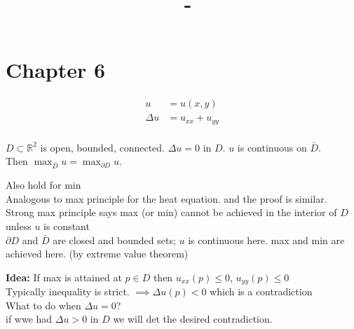 \documentclass[answers, 12pts,addpoints]{exam}
\author{\name}
\title{\course \ - \assignment}
\begin{document}
\maketitle

\section*{Chapter 6}
\begin{align*}
    u &= u(x,y)\\
    \Delta u &= u_{xx} + u_{yy}\\
\end{align*}
\begin{definition}
    $D \subset \mathbb{R}^2$ is open, bounded, connected. $\Delta u = 0$ in $D$. $u$ is continuous on $\bar{D}$.\\
    Then $\max_{\bar{D}} u = \max_{\partial D} u$.
\end{definition}
\begin{remark}
    Also hold for min \\
    Analogous to max principle for the heat equation. and the proof is similar.\\
    Strong max principle says max (or min) cannot be achieved in the interior of $D$ unless $u$ is constant\\
    $\partial D$ and $\bar{D}$ are closed and bounded sets; $u$ is continuous here. max and min are achieved here. (by extreme value theorem)\\
\end{remark}
\textbf{Idea:} If max is attained at $p \in D$ then $u_{xx}(p) \leq 0$, $u_{yy}(p) \leq 0$\\
Typically inequality is strict. $\implies \Delta u(p) < 0$ which is a contradiction \\
What to do when $\Delta u = 0$?\\ 
if wwe had $\Delta u > 0$ in $D$ we will det the desired contradiction.\\
\end{document}
